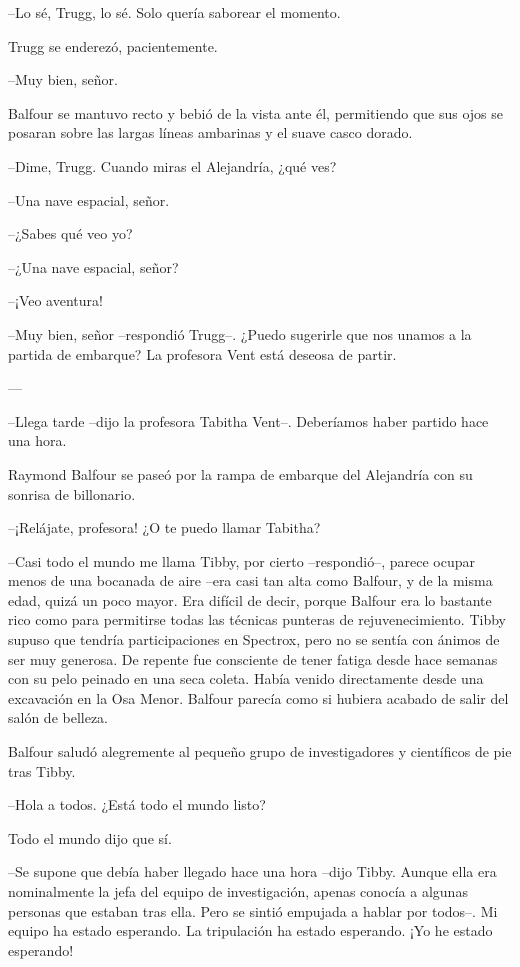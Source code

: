 {--Lo sé, Trugg, lo sé. Solo quería saborear el momento.}

{Trugg se enderezó, pacientemente.}

{--Muy bien, señor.}

{Balfour se mantuvo recto y bebió de la vista ante él, permitiendo que
 sus ojos se posaran sobre las largas líneas ambarinas y el suave casco
dorado.}

{--Dime, Trugg. Cuando miras el Alejandría, ¿qué ves?}

{--Una nave espacial, señor.}

{--¿Sabes qué veo yo?}

{--¿Una nave espacial, señor?}

{--¡Veo aventura!}

{--Muy bien, señor --respondió Trugg--. ¿Puedo sugerirle que nos unamos a
la partida de embarque? La profesora Vent está deseosa de partir.}

{---}

{--Llega tarde --dijo la profesora Tabitha Vent--. Deberíamos haber
partido hace una hora.}

{Raymond Balfour se paseó por la rampa de embarque del Alejandría con su
sonrisa de billonario.}

{--¡Relájate, profesora! ¿O te puedo llamar Tabitha?}

{--Casi todo el mundo me llama Tibby, por cierto --respondió--, parece
 ocupar menos de una bocanada de aire --era casi tan alta como Balfour, y
 de la misma edad, quizá un poco mayor. Era difícil de decir, porque
 Balfour era lo bastante rico como para permitirse todas las técnicas
 punteras de rejuvenecimiento. Tibby supuso que tendría participaciones
 en Spectrox, pero no se sentía con ánimos de ser muy generosa. De
 repente fue consciente de tener fatiga desde hace semanas con su pelo
 peinado en una seca coleta. Había venido directamente desde una
 excavación en la Osa Menor. Balfour parecía como si hubiera acabado de
salir del salón de belleza.}

{Balfour saludó alegremente al pequeño grupo de investigadores y
científicos de pie tras Tibby.}

{--Hola a todos. ¿Está todo el mundo listo?}

{Todo el mundo dijo que sí.}

{--Se supone que debía haber llegado hace una hora --dijo Tibby. Aunque
 ella era nominalmente la jefa del equipo de investigación, apenas
 conocía a algunas personas que estaban tras ella. Pero se sintió
 empujada a hablar por todos--. Mi equipo ha estado esperando. La
tripulación ha estado esperando. ¡Yo he estado esperando!}

